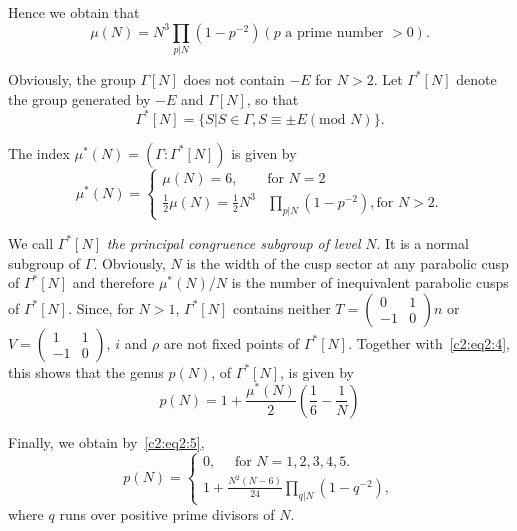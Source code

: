 Hence we obtain that 
\begin{equation*}
\mu(N) = N^3 \prod_{p|N} (1-p^{-2})
 (p \text{ a prime number } >0). \tag{5}\label{c2:eq2:5}
\end{equation*}

Obviously, the group $\Gamma[N]$ does not contain $-E$ for $N>2$. Let
$\Gamma^{\ast}[N]$ denote the group generated by $-E$ and $\Gamma[N]$,
so that 
$$
\Gamma^{\ast} [N] = \{S|S \in \Gamma, S \equiv \pm E (\text{mod } N)\}.
$$

The index $\mu^{\ast} (N) = (\Gamma : \Gamma^{\ast}[N])$ is given by 
\begin{equation*}
\mu^{\ast} (N) = \begin{cases}
\mu(N) = 6, & \text{for } N=2\\
\frac{1}{2} \mu(N) = \frac{1}{2} N^3 & \prod_{p|N} (1-p^{-2}), \text{
  for } N >2.
\end{cases} \tag{6}\label{c2:eq2:6}
\end{equation*}

We call $\Gamma^{\ast}[N]$ \textit{the principal congruence subgroup of
  level} $N$. It is a normal subgroup of
  $\Gamma$. Obviously, $N$ is the width of the cusp sector at any
  parabolic cusp of $\Gamma^{\ast}[N]$ and therefore
  $\mu^{\ast}(N)/N$ is the number of inequivalent parabolic cusps of
  $\Gamma^{\ast}[N]$. Since, for $N>1$, $\Gamma^{\ast}[N]$ contains
  neither $T=\left(\begin{smallmatrix}
    0&1\\-1&0\end{smallmatrix}\right)n$ or $V =
    \left(\begin{smallmatrix} 1&1\\-1&0 \end{smallmatrix}\right)$,
    $i$ and $\rho$ are not fixed points of
    $\Gamma^{\ast}[N]$. Together with~\eqref{c2:eq2:4}, this shows that the genus
    $p(N)$, of $\Gamma^{\ast}[N]$, is given by 
$$
p(N)=1 + \frac{\mu^{\ast}(N)}{2} \left(\frac{1}{6} - \frac{1}{N}\right)
$$

Finally, we obtain by~\eqref{c2:eq2:5},
\begin{equation*}
p(N) = 
\begin{cases}
0, \quad \text{ for } N = 1, 2, 3, 4, 5.\\
1 + \frac{N^2(N-6)}{24} \prod\limits_{q|N} (1-q^{-2}), 
\end{cases}\tag{7}\label{c2:eq2:7}
\end{equation*}\pageoriginale
where $q$ runs over positive prime divisors of $N$. 

